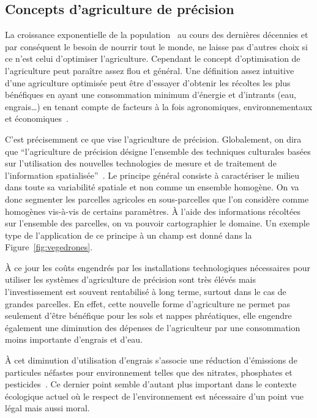 \subsection{Concepts d'agriculture de précision}
La croissance exponentielle de la population~\cite{wiki:popu_mondiale}
au cours des dernières décennies et par conséquent le besoin de nourrir
tout le monde, ne laisse pas d'autres choix
si ce n'est celui d'optimiser l'agriculture.
Cependant le concept d'optimisation de l'agriculture peut 
paraître assez flou et général.
Une définition assez intuitive d'une agriculture optimisée
peut être d'essayer d'obtenir
les récoltes les plus bénéfiques en ayant une consommation minimum d'énergie
et d'intrants (eau, engrais\dots) en tenant compte de facteurs à la fois
agronomiques, environnementaux et économiques~\cite{wiki:agri_prec}.

C'est précisemment ce que vise l'agriculture de précision.
Globalement, on dira que \enquote{l'agriculture de précision désigne
l'ensemble des techniques culturales basées sur l'utilisation
des nouvelles technologies de mesure et de traitement de l'information
spatialisée}~\cite{jullien2005agriculture}.
Le principe général consiste à caractériser le milieu dans toute sa
variabilité spatiale et non comme un ensemble homogène.
On va donc segmenter les parcelles agricoles en sous-parcelles
que l'on considère comme homogènes vis-à-vis de certains paramètres.
À l'aide des informations récoltées sur l'ensemble des parcelles,
on va pouvoir cartographier le domaine.
Un exemple type de l'application de ce principe à un champ
est donné dans la Figure~\ref{fig:vegedrones}.

À ce jour les coûts engendrés par les installations technologiques
nécessaires pour utiliser les systèmes d'agriculture de précision
sont très élévés
mais l'investissement est souvent rentabilisé à long terme, surtout 
dans le cas de grandes parcelles.
En effet, cette nouvelle forme d'agriculture ne permet pas seulement
d'être bénéfique pour les sols et nappes phréatiques,
elle engendre également une diminution des dépenses de l'agriculteur
par une consommation moins importante d'engrais et d'eau.

À cet diminution d'utilisation d'engrais s'associe une réduction
d'émissions de particules néfastes pour
environnement telles que des nitrates, phosphates
et pesticides~\cite{emission_agri_particules}.
Ce dernier point semble d'autant plus important dans le contexte
écologique actuel où le respect de l'environnement est nécessaire
d'un point vue légal mais aussi moral.

